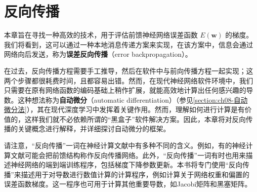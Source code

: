 \documentclass[../main.tex]{subfiles}
\begin{document}
\chapter{反向传播}\label{chapter:ch08-反向传播}

本章旨在寻找一种高效的技术，用于评估前馈神经网络误差函数 $E(\mathbf{w})$ 的梯度。我们将看到，这可以通过一种本地消息传递方案来实现，在该方案中，信息会通过网络向后发送，称为\textbf{误差反向传播}（error backpropagation）。

在过去，反向传播方程需要手工推导，然后在软件中与前向传播方程一起实现；这两个步骤都很耗费时间，且都容易出错。然而，在现代神经网络软件环境中，我们只需要在原有网络函数的编码基础上稍作扩展，就能高效地计算出任何感兴趣的导数。这种想法称为\textbf{自动微分}（automatic differentiation）（参见\cref{section:ch08-自动微分法}），其在现代深度学习中发挥着关键作用。然而，理解如何进行计算是有价值的，这样我们就不必依赖所谓的“黑盒子”软件解决方案。因此，本章将对反向传播的关键概念进行解释，并详细探讨自动微分的框架。

请注意，“反向传播”一词在神经计算文献中有多种不同的含义。例如，有的神经计算文献可能会把前馈结构称作反向传播网络。此外，“反向传播”一词有时也用来描述神经网络的端到端训练程序，包括梯度下降参数更新。本书将专门使用“反向传播”来描述用于对导数进行数值计算的计算程序，例如计算关于网络权重和偏置的误差函数梯度。这一程序也可用于计算其他重要导数，如Jacobi矩阵和黑塞矩阵。




\end{document}

